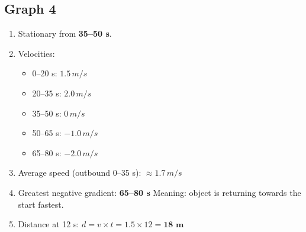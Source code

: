\documentclass[12pt]{article}
\begin{document}
\subsection*{Graph 4}

\begin{enumerate}[label=\textbf{4.\arabic*}]
  \item Stationary from \textbf{35--50 s}.

  \item Velocities:
  \begin{itemize}
    \item 0--20 s: $1.5\,\si{m/s}$
    \item 20--35 s: $2.0\,\si{m/s}$
    \item 35--50 s: $0\,\si{m/s}$
    \item 50--65 s: $-1.0\,\si{m/s}$
    \item 65--80 s: $-2.0\,\si{m/s}$
  \end{itemize}

  \item Average speed (outbound 0--35 s):  
  $\approx 1.7\,\si{m/s}$

  \item Greatest negative gradient: \textbf{65--80 s}  
  Meaning: object is returning towards the start fastest.

  \item Distance at 12 s:  
  $d = v \times t = 1.5 \times 12 = \textbf{18 m}$
\end{enumerate}
\end{document}
